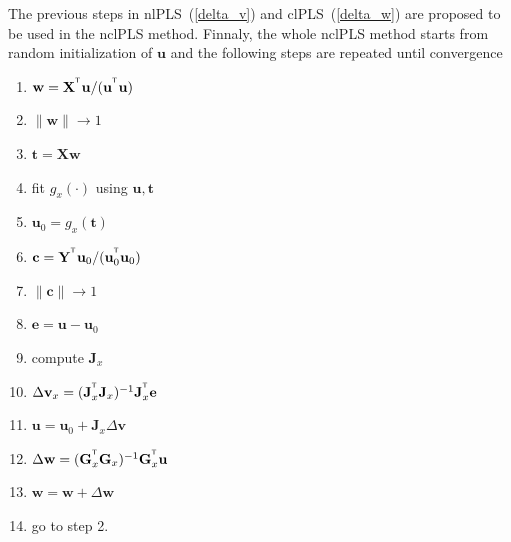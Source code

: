 \documentclass[12pt,twoside]{article}
\newcommand{\bw}{\mathbf{w}}
\newcommand{\bY}{\mathbf{Y}}
\newcommand{\bX}{\mathbf{X}}
\newcommand{\bu}{\mathbf{u}}
\newcommand{\bt}{\mathbf{t}}
\newcommand{\bv}{\mathbf{v}}
\newcommand{\be}{\mathbf{e}}
\newcommand{\bc}{\mathbf{c}}
\newcommand{\bG}{\mathbf{G}}
\newcommand{\bJ}{\mathbf{J}}
\begin{document}
	The previous steps in nlPLS~(\ref{delta_v}) and clPLS~(\ref{delta_w}) are proposed to be used in the nclPLS method.
	Finnaly, the whole nclPLS method starts from random initialization of $\bu$ and the following steps are repeated until convergence

	\begin{multicols}{2}
	\begin{enumerate}
		\item $\bw = \bX^{\T} \bu / (\bu^{\T} \bu )$

		\item $\| \bw \| \to 1$

		\item $\bt = \bX \bw$

		\item fit $g_x(\cdot)$ using $\bu, \bt$

		\item $\bu_{0} = g_x(\bt)$

		\item $\bc = \bY^{\T} \bu_{0} / (\bu_{0}^{\T} \bu_{0})$

		\item $\| \bc \| \to 1$

		\item $\be = \bu - \bu_{0}$ 

		\item compute $\bJ_x$

		\item $\Delta \bv_x = (\bJ_x^{\T} \bJ_x)^{-1} \bJ_x^{\T} \be$

		\item $\bu = \bu_{0} + \bJ_x \Delta \bv$

		\item $\Delta \bw = (\bG_x^{\T} \bG_x)^{-1} \bG_x^{\T} \bu$

		\item $\bw = \bw + \Delta \bw$

		\item go to step 2.
	\end{enumerate}
	\end{multicols}
 

\end{document}
